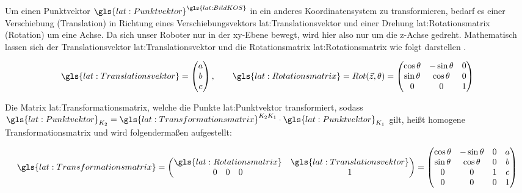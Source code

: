 Um einen Punktvektor \( \gls{lat:Punktvektor}^{\gls{lat:BildKOS}} \) in ein anderes Koordinatensystem zu transformieren, bedarf es einer Verschiebung (Translation) in Richtung eines Verschiebungsvektors \gls{lat:Translationsvektor} und einer Drehung \gls{lat:Rotationsmatrix} (Rotation) um eine Achse. Da sich unser Roboter nur in der xy-Ebene bewegt, wird hier also nur um die z-Achse gedreht.  
Mathematisch lassen sich der Translationsvektor \gls{lat:Translationsvektor} und die Rotationsmatrix \gls{lat:Rotationsmatrix} wie folgt darstellen \autocite{bajdRobotics2010}.

\begin{equation}
\gls{lat:Translationsvektor} = 
\begin{pmatrix}
a 	\\
b 	\\
c    	\\
\end{pmatrix}
, \qquad
\gls{lat:Rotationsmatrix} = Rot(\vec{z},\theta) = 
\begin{pmatrix}
\cos{\theta} & -\sin{\theta} & {0} 	\\
\sin{\theta} & \cos{\theta} & {0} 	\\
{0} & {0} & {1} 				    	\\
\end{pmatrix}
\end{equation} 		

Die Matrix \gls{lat:Transformationsmatrix}, welche die Punkte \gls{lat:Punktvektor} transformiert, sodass 
\( \gls{lat:Punktvektor}_{K_2} = \gls{lat:Transformationsmatrix}^{K_2K_1} \cdot  \gls{lat:Punktvektor}_{K_1}	\) gilt, heißt homogene Transformationsmatrix und wird folgendermaßen aufgestellt:

\begin{equation}
\gls{lat:Transformationsmatrix} = 
\begin{pmatrix}
\gls{lat:Rotationsmatrix} &  \gls{lat:Translationsvektor}	\\
0 \quad 0 \quad 0 & 1 	\\
\end{pmatrix}
=
\begin{pmatrix}
\cos{\theta} & -\sin{\theta} & {0} & a 	\\
\sin{\theta} & \cos{\theta} & {0} & b 	\\
{0} & {0} & {1} & c 				    	\\
0 & 0 & 0 & 1 						\\
\end{pmatrix}
\end{equation}

